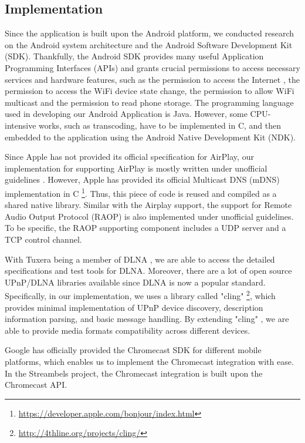 \subsection{Implementation\label{3_2}}
Since the application is built upon the Android platform, we conducted research
on the Android system architecture and the Android Software Development Kit
(SDK). Thankfully, the Android SDK provides many useful Application Programming
Interfaces (APIs) and grants crucial permissions to access necessary services
and hardware features, such as the permission to access the Internet , the
permission to access the WiFi device state change, the permission to allow WiFi
multicast and  the permission to read phone storage. The programming language
used in developing our Android Application is Java. However, some CPU-intensive
works, such as transcoding, have to be implemented in C, and then embedded to
the application using the Android Native Development Kit (NDK).

Since Apple has not provided its official specification for AirPlay, our
implementation for supporting AirPlay is mostly written under unofficial
guidelines \cite{AirPlay-spec}. However, Apple has provided its official
Multicast DNS (mDNS) implementation in C
\footnote{\url{https://developer.apple.com/bonjour/index.html}}. Thus, this
piece of code is reused and compiled as a shared native library. Similar with
the Airplay support, the support for Remote Audio Output Protocol (RAOP) is
also implemented under unofficial guidelines.
To be specific, the RAOP supporting component includes a UDP server and a TCP
control channel.

With Tuxera being a member of DLNA , we are able to access the detailed specifications and test tools for DLNA. Moreover,  there are a lot of open source UPnP/DLNA
 libraries available since DLNA is now a popular standard. Specifically, in our
 implementation, we uses a library called "cling" \cite{cling}
 \footnote{\url{http://4thline.org/projects/cling/}}, which provides minimal
 implementation of UPnP device discovery, description information parsing, and basic message handling. By extending "cling" \cite{cling}, we are able to provide media formats compatibility across different devices.

Google has officially provided the Chromecast SDK for different mobile platforms, which enables us to  implement the Chromecast integration with ease. In the Streambels project, the Chromecast integration is built upon the Chromecast API.

